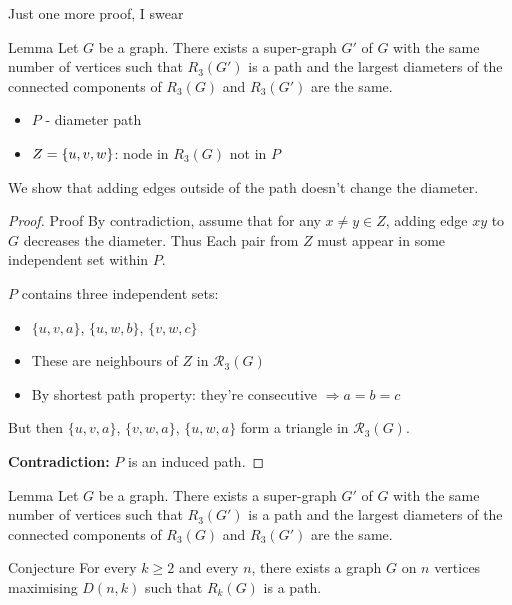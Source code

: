 \begin{frame}{Just one more proof, I swear}
    \begin{lemma}{Lemma}
        Let \(G\) be a graph. There exists a super-graph \(G'\) of \(G\) with the same number of vertices such that \(R_3(G')\) is a path and the largest diameters of the connected components of \(R_3(G)\) and \(R_3(G')\) are the same.
    \end{lemma}
\end{frame}
\begin{frame}
    \begin{itemize}
        \item \(P\) - diameter path
        \item \(Z=\left\{ u,v,w \right\}\): node in \(R_3(G)\) not in \(P\)
    \end{itemize}
We show that adding edges outside of the path doesn't change the diameter.
\begin{proof}{Proof}
By contradiction, assume that for any \(x \neq y \in Z\), adding edge \(xy\) to \(G\) decreases the diameter. Thus Each pair from \(Z\) must appear in some independent set within \(P\).

\vspace{0.3cm}

$P$ contains three independent sets:
\begin{itemize}
    \item $\{u, v, a\}$, $\{u, w, b\}$, $\{v, w, c\}$ 
    \item These are neighbours of $Z$ in $\mathcal{R}_3(G)$
    \item By shortest path property: they're consecutive $\Rightarrow a = b = c$
\end{itemize}

But then $\{u,v,a\}$, $\{v,w,a\}$, $\{u,w,a\}$ form a triangle in $\mathcal{R}_3(G)$.

\textbf{Contradiction:} $P$ is an induced path.

\end{proof}

\end{frame}
\begin{frame}{}
    \begin{lemma}{Lemma}
        Let \(G\) be a graph. There exists a super-graph \(G'\) of \(G\) with the same number of vertices such that \(R_3(G')\) is a path and the largest diameters of the connected components of \(R_3(G)\) and \(R_3(G')\) are the same.
    \end{lemma}
    \begin{Lemma}{Conjecture}
        For every \(k \geq 2\) and every \(n\), there exists a graph \(G\) on \(n\) vertices maximising \(D(n,k)\) such that \(R_k(G)\) is a path.
    \end{Lemma}
\end{frame}
